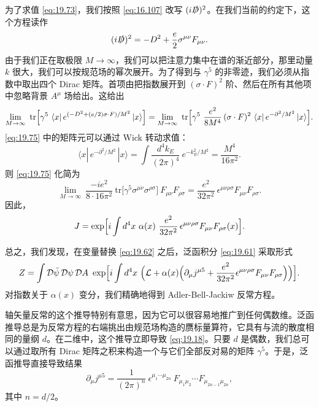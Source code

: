 为了求值 \eqref{eq:19.73}，我们按照 \eqref{eq:16.107} 改写 $(i\slashed{D})^2$。在我们当前的约定下，这个方程读作
\begin{equation}
  (i\slashed{D})^2 = -D^2 + \frac{e}{2}\sigma^{\mu\nu}F_{\mu\nu} .
  \label{eq:19.74}
\end{equation}
由于我们正在取极限 $M\to\infty$，我们可以把注意力集中在谱的渐近部分，那里动量 $k$ 很大，我们可以按规范场的幂次展开。为了得到与 $\gamma^5$ 的非零迹，我们必须从指数中取出四个 Dirac 矩阵。首项由把指数展开到 $(\sigma\cdot F)^2$ 阶、然后在所有其他项中忽略背景 $A^\mu$ 场给出。这给出
\begin{equation}
  \lim_{M\to\infty}\ \mathrm{tr}\Bigl[ \gamma^5\ \langle x|\,
    e^{(-D^2+(e/2)\sigma\cdot F)/M^2}\,|x\rangle \Bigr]
  = \lim_{M\to\infty}\ \mathrm{tr}\Bigl[ \gamma^5\ \frac{e^2}{8M^4}\,
    (\sigma\cdot F)^2\ \langle x|\,e^{-\partial^2/M^2}\,|x\rangle \Bigr] .
  \label{eq:19.75}
\end{equation}
\eqref{eq:19.75} 中的矩阵元可以通过 Wick 转动求值：
\begin{equation}
  \langle x|\,e^{-\partial^2/M^2}\,|x\rangle
  = \int \frac{d^4k_E}{(2\pi)^4}\ e^{-k_E^2/M^2}
  = \frac{M^4}{16\pi^2} .
  \label{eq:19.76}
\end{equation}
则 \eqref{eq:19.75} 化简为
\begin{equation}
  \lim_{M\to\infty}\ \frac{-ie^2}{8\cdot16\pi^2}\ \mathrm{tr}\bigl[
    \gamma^5\sigma^{\mu\nu}\sigma^{\rho\sigma} \bigr]\ F_{\mu\nu}F_{\rho\sigma}
  = \frac{e^2}{32\pi^2}\ \epsilon^{\mu\nu\rho\sigma}F_{\mu\nu}F_{\rho\sigma}
  .
  \label{eq:19.77}
\end{equation}
因此，
\begin{equation}
  J = \exp\Bigl[ i\int d^4x\ \alpha(x)\ \frac{e^2}{32\pi^2}\,
    \epsilon^{\mu\nu\rho\sigma}F_{\mu\nu}F_{\rho\sigma}(x) \Bigr] .
  \label{eq:19.78}
\end{equation}

总之，我们发现，在变量替换 \eqref{eq:19.62} 之后，泛函积分 \eqref{eq:19.61} 采取形式
\begin{equation}
  Z = \int \mathcal{D}\bar{\psi}\,\mathcal{D}\psi\,\mathcal{D}A\ \exp\Bigl[
    i\int d^4x\ \Bigl( \mathcal{L} + \alpha(x)\Bigl( \partial_\mu j^{\mu 5}
      + \frac{e^2}{32\pi^2}\epsilon^{\mu\nu\rho\sigma}F_{\mu\nu}F_{\rho\sigma}
      \Bigr) \Bigr) \Bigr] .
  \label{eq:19.79}
\end{equation}
对指数关于 $\alpha(x)$ 变分，我们精确地得到 Adler-Bell-Jackiw 反常方程。

轴矢量反常的这个推导特别有意思，因为它可以很容易地推广到任何偶数维。泛函推导总是为反常方程的右端挑出由规范场构造的赝标量算符，它具有与流的散度相同的量纲 $d$。在二维中，这个推导立即导致 \eqref{eq:19.18}。只要 $d$ 是偶数，我们总可以通过取所有 Dirac 矩阵之积来构造一个与它们全部反对易的矩阵 $\gamma^5$。于是，泛函推导直接导致结果
\begin{equation}
  \partial_\mu j^{\mu 5} = \frac{1}{(2\pi)^n}\ \epsilon^{\mu_1\cdots\mu_{2n}}\
    F_{\mu_1\mu_2}\cdots F_{\mu_{2n-1}\mu_{2n}} ,
  \label{eq:19.80}
\end{equation}
其中 $n = d/2$。

